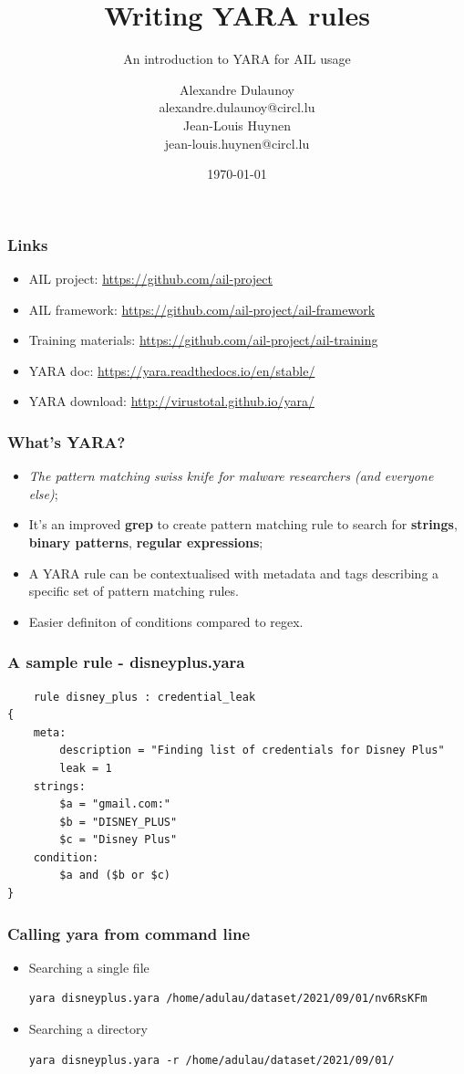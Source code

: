 \documentclass{beamer}
\author{\large{Alexandre Dulaunoy}\\ \scriptsize{alexandre.dulaunoy@circl.lu}\\ \large{Jean-Louis Huynen}\\ \scriptsize{jean-louis.huynen@circl.lu}\\}
\title{Writing YARA rules}
\subtitle{An introduction to YARA for AIL usage}
\institute{info@circl.lu}
\date{\today}
\begin{document}
\begin{frame}[t,plain]
\titlepage
\end{frame}

\begin{frame}
\frametitle{Links}
    \begin{itemize}
        \item AIL project: \url{https://github.com/ail-project}
        \item AIL framework: \url{https://github.com/ail-project/ail-framework}
        \item Training materials: \url{https://github.com/ail-project/ail-training}
	\item YARA doc: \url{https://yara.readthedocs.io/en/stable/} 
	\item YARA download:  \url{http://virustotal.github.io/yara/}
    \end{itemize}
\end{frame}

\begin{frame}[fragile]
\frametitle{What's YARA?}
	\begin{itemize}
	\item {\it The pattern matching swiss knife for malware researchers (and everyone else)};
	\item It's an improved {\bf grep} to create pattern matching rule to search for {\bf strings}, {\bf binary patterns}, {\bf regular expressions};
	\item A YARA rule can be contextualised with metadata and tags describing a specific set of pattern matching rules.
	\item Easier definiton of conditions compared to regex.
	\end{itemize}
\end{frame}

\lstset{language=Python}
\begin{frame}[fragile]
\frametitle{A sample rule - disneyplus.yara}
	\begin{lstlisting}
	rule disney_plus : credential_leak 
{
    meta:                                        
        description = "Finding list of credentials for Disney Plus"
        leak = 1
    strings: 
        $a = "gmail.com:"
        $b = "DISNEY_PLUS"
        $c = "Disney Plus"
    condition:
        $a and ($b or $c) 
}
	\end{lstlisting}
\end{frame}


\lstset{language=sh}
\begin{frame}[fragile]
\frametitle{Calling yara from command line}
	\begin{itemize}
	\item Searching a single file
	\begin{lstlisting}
yara disneyplus.yara /home/adulau/dataset/2021/09/01/nv6RsKFm
	\end{lstlisting}
	\item Searching a directory
	\begin{lstlisting}
yara disneyplus.yara -r /home/adulau/dataset/2021/09/01/
	\end{lstlisting}
	\end{itemize}
\end{frame}
\end{document}

